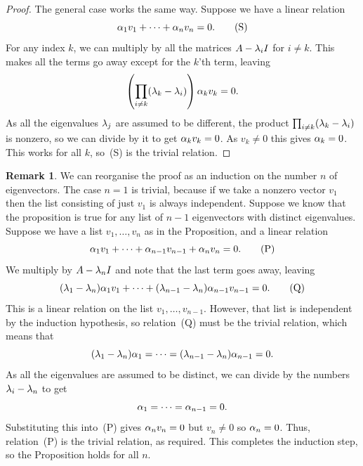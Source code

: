 \documentclass[reqno]{amsart}
\theoremstyle{definition}
\newtheorem{remark}[theorem]{Remark}
\begin{document}
\begin{proof}
 The general case works the same way.  Suppose we have a linear relation
 \[ \alpha_1v_1 + \dotsb + \alpha_nv_n = 0. \tag{S} \]
 For any index $k$, we can multiply by all the matrices $A-\lambda_iI$ for
 $i\neq k$.  This makes all the terms go away except for the $k$'th
 term, leaving
 \[ \left(\prod_{i\neq k}(\lambda_k-\lambda_i)\right) \alpha_kv_k = 0. \]
 As all the eigenvalues $\lambda_j$ are assumed to be different, the
 product $\prod_{i\neq k}(\lambda_k-\lambda_i)$ is nonzero, so we can divide
 by it to get $\alpha_kv_k=0$.  As $v_k\neq 0$ this gives $\alpha_k=0$.
 This works for all $k$, so~(S) is the trivial relation.
\end{proof}

\begin{remark}\label{rem-eigenvectors-independent}
 We can reorganise the proof as an induction on the number $n$ of
 eigenvectors.  The case $n=1$ is trivial, because if we take a
 nonzero vector $v_1$ then the list consisting of just $v_1$ is always
 independent.  Suppose we know that the proposition is true for
 any list of $n-1$ eigenvectors with distinct eigenvalues.  Suppose we
 have a list $v_1,\dotsc,v_n$ as in the Proposition, and a linear
 relation
 \[ \alpha_1v_1 + \dotsb + \alpha_{n-1}v_{n-1} + \alpha_nv_n = 0. \tag{P} \]
 We multiply by $A-\lambda_nI$ and note that the last term goes away,
 leaving
 \[ (\lambda_1-\lambda_n)\alpha_1v_1 + \dotsb +
    (\lambda_{n-1}-\lambda_n)\alpha_{n-1}v_{n-1} = 0. \tag{Q}
 \]
 This is a linear relation on the list $v_1,\dotsc,v_{n-1}$.  However,
 that list is independent by the induction hypothesis, so relation~(Q)
 must be the trivial relation, which means that
 \[ (\lambda_1-\lambda_n)\alpha_1 = \dotsb =
    (\lambda_{n-1}-\lambda_n)\alpha_{n-1} = 0.
 \]
 As all the eigenvalues are assumed to be distinct, we can divide by
 the numbers $\lambda_i-\lambda_n$ to get
 \[ \alpha_1 = \dotsb = \alpha_{n-1} = 0. \]
 Substituting this into~(P) gives $\alpha_nv_n=0$ but $v_n\neq 0$ so
 $\alpha_n=0$.  Thus, relation~(P) is the trivial relation, as required.
 This completes the induction step, so the Proposition holds for all
 $n$.
\end{remark}
\end{document}
